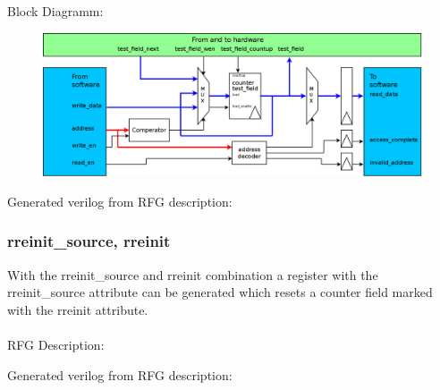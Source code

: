 \documentclass[12pt,a4paper]{article}
\begin{document}
Block Diagramm:
\begin{figure}[h!]
    \includegraphics[width=\textwidth]{pictures/Reg_hrw_srw_counter.png}
\end{figure}
\newpage
Generated verilog from RFG description:

\newpage

\subsubsection{rreinit\_source, rreinit}
With the rreinit\_source and rreinit combination a register with the rreinit\_source attribute can be generated which resets a counter field marked with the rreinit attribute.\\
\\
RFG Description:

\newpage
Generated verilog from RFG description:

\newpage
\end{document}
